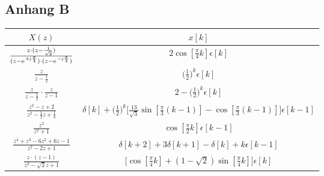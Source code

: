 \subsection{Anhang B}
\label{sec:AnhangB}
\begin{center}
	\begin{tabular}{|c|c|}
		\hline
		$X(z)$ & $x[k]$ \\ [2ex]
		\hline
		$\frac{z\cdot(z-\frac{1}{\sqrt{2}})}{(z-\e^{+\im\frac{\pi}{4}})\cdot(z-\e^{-\im\frac{\pi}{4}})}$ & $2\cos[\frac{\pi}{4}k]\epsilon[k]$ \\[2ex]
		\hline
		$\frac{z}{z-\frac{1}{2}}$ & $\bigg (\frac{1}{2} \bigg)^{k}\epsilon[k]$ \\[2ex]
		\hline
		$\frac{z}{z-\frac{1}{2}}\cdot\frac{z}{z-1} $ & $2-\bigg(\frac{1}{2}\bigg)^k\epsilon[k] $\\[2ex]
		\hline
		$\frac{z^2-z+2}{z^2-\frac{1}{2}z+\frac{1}{4}}$ & $\delta[k]+\bigg(\frac{1}{2}\bigg)^k\Bigg[\frac{13}{\sqrt{3}}\sin[\frac{\pi}{3}(k-1)]-\cos[\frac{\pi}{3}(k-1)]\Bigg]\epsilon[k-1]$ \\[2ex]
		\hline
		$\frac{z^2}{z^2+1}$ & $\cos[\frac{\pi}{2}k]\epsilon[k-1]$\\[2ex]
		\hline
		$\frac{z^4+z^3-6z^2+6z-1}{z^2-2z+1}$ & $\delta[k+2]+3\delta[k+1]-\delta[k]+k\epsilon[k-1]$\\[2ex]
		\hline
		$\frac{z\cdot(z-1)}{z^2-\sqrt{2}z+1}$ & $\Bigg[\cos[\frac{\pi}{4}k]+(1-\sqrt{2})\sin[\frac{\pi}{4}k]\Bigg] \epsilon[k]$\\[2ex]
		\hline
	\end{tabular}
\end{center}